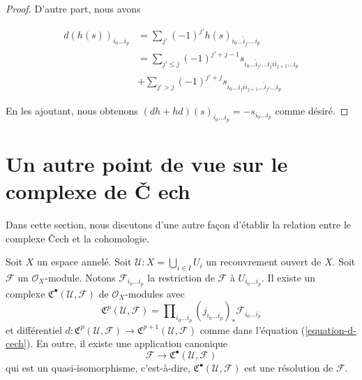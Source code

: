 \begin{proof}
D'autre part, nous avons

\begin{align*}
d(h(s))_{i_0 \ldots i_p}
& =
\sum\nolimits_{j'} (-1)^{j'} h(s)_{i_0 \ldots \hat i_{j'} \ldots i_p} \\
& =
\sum\nolimits_{j' \leq j} (-1)^{j' + j - 1}
s_{i_0 \ldots \hat i_{j'} \ldots i_j i i_{j + 1} \ldots i_p} \\
& +
\sum\nolimits_{j' > j} (-1)^{j' + j}
s_{i_0 \ldots i_j i i_{j + 1} \ldots \hat i_{j'} \ldots i_p}
\end{align*}

En les ajoutant, nous obtenons
$(dh + hd)(s)_{i_0 \ldots i_p} = - s_{i_0 \ldots i_p}$
comme désiré.

\end{proof}





\section{Un autre point de vue sur le complexe de {\v C}
ech}
\label{section-locally-finite-cech}

\noindent
Dans cette section, nous discutons d'une autre façon d'établir la relation entre le complexe {\v C}ech et la cohomologie.

\begin{lemma}

\label{lemma-covering-resolution}

Soit $X$ un espace annelé. Soit $\mathcal{U} : X = \bigcup_{i \in I} U_i$
un recouvrement ouvert de $X$. Soit $\mathcal{F}$ un $\mathcal{O}_X$-module. Notons $\mathcal{F}_{i_0 \ldots i_p}$ la restriction de
$\mathcal{F}$ à $U_{i_0 \ldots i_p}$. Il existe un complexe
${\mathfrak C}^\bullet(\mathcal{U}, \mathcal{F})$
de $\mathcal{O}_X$-modules avec
$$
{\mathfrak C}^p(\mathcal{U}, \mathcal{F}) =
\prod\nolimits_{i_0 \ldots i_p}
(j_{i_0 \ldots i_p})_* \mathcal{F}_{i_0 \ldots i_p}
$$
et différentiel
$d : {\mathfrak C}^p(\mathcal{U}, \mathcal{F})
\to {\mathfrak C}^{p + 1}(\mathcal{U}, \mathcal{F})$
comme dans l'équation (\ref{equation-d-cech}). En outre, il existe une application canonique
$$
\mathcal{F} \to {\mathfrak C}^\bullet(\mathcal{U}, \mathcal{F})
$$
qui est un quasi-isomorphisme, c'est-à-dire,
${\mathfrak C}^\bullet(\mathcal{U}, \mathcal{F})$
est une résolution de $\mathcal{F}$.

\end{lemma}

